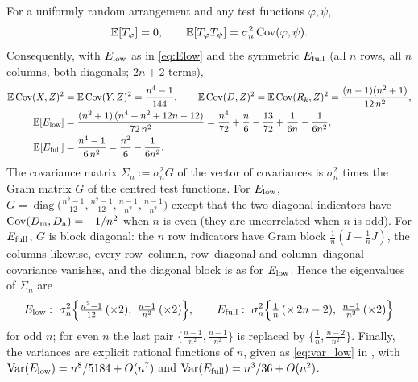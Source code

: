 \begin{proposition}
\label{prop:random_energy_moments}
For a uniformly random arrangement and any test functions $\varphi,\psi$,
\begin{equation}
\mathbb{E}[T_\varphi]=0,\qquad
\mathbb{E}[T_\varphi T_\psi] = \sigma_n^2\,\mathrm{Cov}(\varphi,\psi).
\label{eq:cov_T}
\end{equation}
Consequently, with $E_{\mathrm{low}}$ as in \eqref{eq:Elow} and the symmetric
$E_{\mathrm{full}}$ (all $n$ rows, all $n$ columns, both diagonals; $2n+2$ terms),
\begin{align}
\mathbb{E}\,\mathrm{Cov}(X,Z)^2 &= \mathbb{E}\,\mathrm{Cov}(Y,Z)^2 = \frac{n^4-1}{144},\qquad
\mathbb{E}\,\mathrm{Cov}(D,Z)^2 = \mathbb{E}\,\mathrm{Cov}(R_k,Z)^2 = \frac{(n-1)(n^2+1)}{12\,n^2},
\label{eq:single_terms}\\
\mathbb{E}[E_{\mathrm{low}}] &= \frac{(n^2+1)\,(n^4-n^2+12n-12)}{72\,n^2}
= \frac{n^4}{72}+\frac{n}{6}-\frac{13}{72}+\frac{1}{6n}-\frac{1}{6n^2},
\label{eq:mean_low}\\
\mathbb{E}[E_{\mathrm{full}}] &= \frac{n^4-1}{6\,n^2} = \frac{n^2}{6}-\frac{1}{6n^2}.
\label{eq:mean_full}
\end{align}
The covariance matrix $\Sigma_n:=\sigma_n^2 G$ of the vector of covariances is $\sigma_n^2$ times
the Gram matrix $G$ of the centred test functions. For $E_{\mathrm{low}}$,
$G=\operatorname{diag}\!\big(\tfrac{n^2-1}{12},\tfrac{n^2-1}{12},\tfrac{n-1}{n^2},\tfrac{n-1}{n^2}\big)$
except that the two diagonal indicators have $\mathrm{Cov}(D_{\mathrm{m}},D_{\mathrm{a}})=-1/n^2$ when
$n$ is even (they are uncorrelated when $n$ is odd). For $E_{\mathrm{full}}$, $G$ is block diagonal:
the $n$ row indicators have Gram block $\tfrac1n(I-\tfrac1n J)$, the columns likewise, every
row--column, row--diagonal and column--diagonal covariance vanishes, and the diagonal block is as for
$E_{\mathrm{low}}$. Hence the eigenvalues of $\Sigma_n$ are
\begin{equation}
\Elow:\ \sigma_n^2\Big\{\tfrac{n^2-1}{12}\,(\times 2),\ \tfrac{n-1}{n^2}\,(\times 2)\Big\},
\qquad
\Efull:\ \sigma_n^2\Big\{\tfrac1n\,(\times\,2n-2),\ \tfrac{n-1}{n^2}\,(\times 2)\Big\}
\label{eq:weights}
\end{equation}
for odd $n$; for even $n$ the last pair $\{\tfrac{n-1}{n^2},\tfrac{n-1}{n^2}\}$ is replaced by
$\{\tfrac1n,\tfrac{n-2}{n^2}\}$. Finally, the variances are explicit rational functions of $n$, given as
\eqref{eq:var_low} in , with $\mathrm{Var}(E_{\mathrm{low}})=n^8/5184+O(n^7)$ and $\mathrm{Var}(E_{\mathrm{full}})=n^3/36+O(n^2)$.
\end{proposition}

